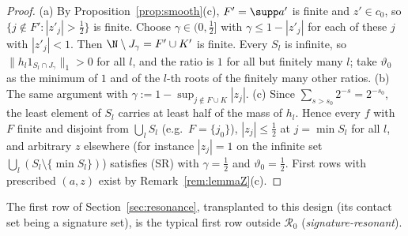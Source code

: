 \begin{proof}
(a) By Proposition~\ref{prop:smooth}(c), $F'=\supp a'$ is finite and
$z'\in c_0$, so $\{j\notin F':|z'_j|>\frac12\}$ is finite.  Choose
$\gamma\in(0,\frac12]$ with $\gamma\le1-|z'_j|$ for each of these $j$ with
$|z'_j|<1$.  Then $\N\setminus J_\gamma=F'\cup K'$ is finite.  Every $S_l$
is infinite, so $\|h_l1_{S_l\cap J_\gamma}\|_1>0$ for all $l$, and the
ratio is $1$ for all but finitely many $l$; take $\vartheta_0$ as the
minimum of $1$ and of the $l$-th roots of the finitely many other ratios.
(b) The same argument with $\gamma:=1-\sup_{j\notin F\cup K}|z_j|$.
(c) Since $\sum_{s>s_0}2^{-s}=2^{-s_0}$, the least element of $S_l$ carries
at least half of the mass of $h_l$.  Hence every $f$ with $F$ finite and
disjoint from $\bigcup_lS_l$ (e.g.\ $F=\{j_0\}$),
$|z_j|\le\frac12$ at $j=\min S_l$ for all $l$, and arbitrary $z$
elsewhere (for instance $|z_j|=1$ on the infinite set
$\bigcup_l(S_l\setminus\{\min S_l\})$) satisfies (SR) with $\gamma=\frac12$
and $\vartheta_0=\frac12$.  First rows with prescribed $(a,z)$ exist by
Remark~\ref{rem:lemmaZ}(c).
\end{proof}

The first row of Section~\ref{sec:resonance}, transplanted to this design
(its contact set being a signature set), is the typical first row outside
$\mathcal R_0$ (\emph{signature-resonant}).
